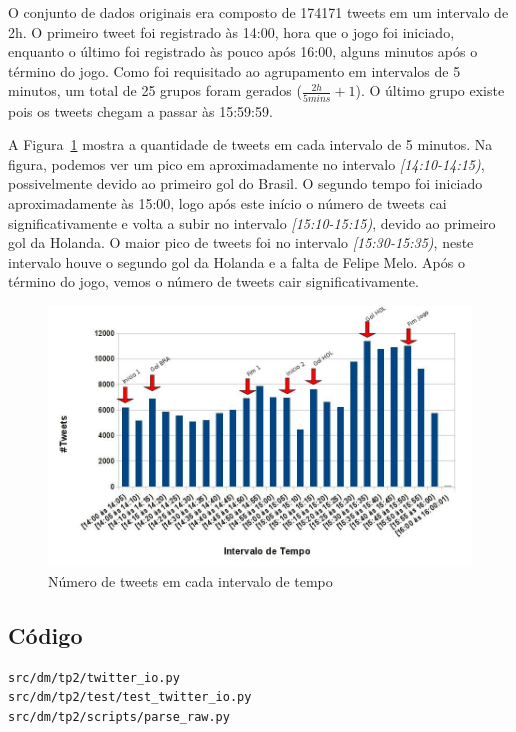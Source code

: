 \documentclass[brazil,a4paper,12pt]{article}
\begin{document}
O conjunto de dados originais era composto de 174171 tweets em um intervalo de 2h. 
O primeiro tweet foi registrado às 14:00, hora que o jogo foi iniciado, enquanto
o último foi registrado às pouco após 16:00, alguns minutos após o término do jogo. 
Como foi requisitado ao agrupamento em intervalos de 5 minutos, um total de 25
grupos foram gerados ($\frac{2h}{5mins} + 1$). O último grupo existe pois os tweets
chegam a passar às 15:59:59.

A Figura~\ref{fig:groups} mostra a quantidade de tweets em cada intervalo de 5
minutos. Na figura, podemos ver um pico em aproximadamente no intervalo
\emph{[14:10-14:15)}, possivelmente devido ao primeiro gol do Brasil. O segundo
tempo foi iniciado aproximadamente às 15:00, logo após este início o número de 
tweets cai significativamente e volta a subir no intervalo \emph{[15:10-15:15)},
devido ao primeiro gol da Holanda. O maior pico de tweets foi no intervalo
\emph{[15:30-15:35)}, neste intervalo houve o segundo gol da Holanda e a
falta de Felipe Melo. Após o término do jogo, vemos o número de tweets cair
significativamente.

\begin{figure}
\centering
\includegraphics[scale=0.4]{group-hist.jpg}
\caption{Número de tweets em cada intervalo de tempo}
\label{fig:groups}
\end{figure}

\subsection{Código}
\begin{verbatim}
src/dm/tp2/twitter_io.py
src/dm/tp2/test/test_twitter_io.py
src/dm/tp2/scripts/parse_raw.py
\end{verbatim}
\end{document}
